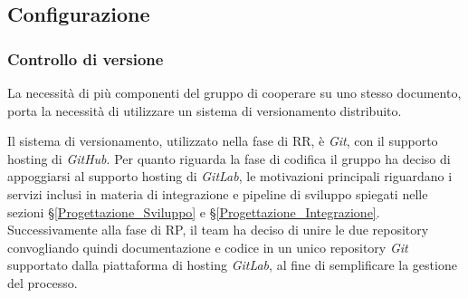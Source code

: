 

\subsection{Configurazione}
\subsubsection{Controllo di versione}\label{ProcessiSupporto_Versionamento}
La necessità di più componenti del gruppo di cooperare su uno stesso documento, porta la necessità di utilizzare un sistema di versionamento distribuito.



Il sistema di versionamento, utilizzato nella fase di RR, è \textit{Git}, con il supporto hosting di \textit{GitHub}. Per quanto riguarda la fase di codifica il gruppo ha deciso di appoggiarsi al supporto hosting di \textit{GitLab}, le motivazioni principali riguardano i servizi inclusi in materia di integrazione e pipeline di sviluppo spiegati nelle sezioni §\ref{Progettazione_Sviluppo} e §\ref{Progettazione_Integrazione}.\\
Successivamente alla fase di RP, il team ha deciso di unire le due repository convogliando quindi documentazione e codice in un unico repository \textit{Git} supportato dalla piattaforma di hosting \textit{GitLab}, al fine di semplificare la gestione del processo.

